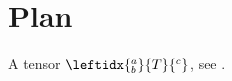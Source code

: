 \documentclass{article}
\begin{document}
\section{Plan}\label{sec:plan}
A tensor $\leftidx{^a_b}{T}{^c}$, see . 

\balance
\end{document}
